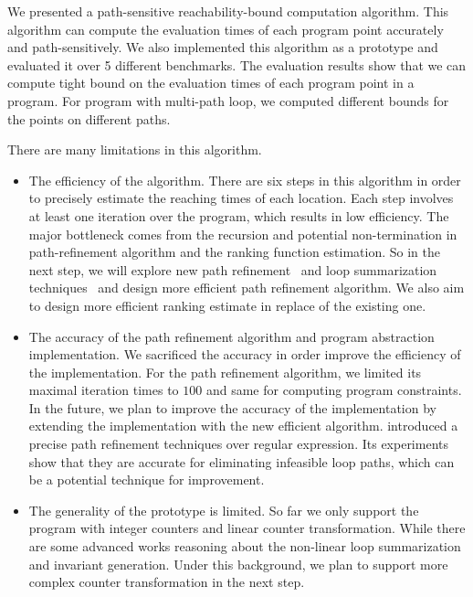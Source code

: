 We presented a path-sensitive reachability-bound computation algorithm.
This algorithm can compute the evaluation times of each program point accurately and path-sensitively.
We also implemented this algorithm as a prototype and evaluated it over 5 different benchmarks.
The evaluation results show that we can compute tight bound on the evaluation times of each program point in a program. For program with multi-path loop, we computed different bounds for the points on different paths.

There are many limitations in this algorithm.
\begin{itemize}
    \item The efficiency of the algorithm.
    There are six steps in this algorithm in order to precisely estimate the reaching times of each location. Each step involves at least one iteration over the program, which results in low efficiency.
    The major bottleneck comes from the recursion and potential non-termination in path-refinement algorithm and the ranking function estimation. So in the next step, we will explore new path refinement~\cite{CyphertBKR19} and loop summarization techniques~\cite{BreckCKR20,KincaidBCR19,KincaidCBR18} and design more efficient path refinement algorithm. We also aim to design more efficient ranking estimate in replace of the existing one.
    \item The accuracy of the path refinement algorithm and program abstraction implementation.
    We sacrificed the accuracy in order improve the efficiency of the implementation. For the path refinement algorithm,
    we limited its maximal iteration times to $100$ and same for computing program constraints. 
    In the future, we plan to improve the accuracy of the implementation by extending the implementation with the new efficient algorithm.
    \cite{CyphertBKR19} introduced a precise path refinement techniques over regular expression. Its experiments show that they are accurate for eliminating infeasible loop paths, which can be a potential technique for improvement.
    \item The generality of the prototype is limited. So far we only support the program with integer counters and linear counter transformation. While there are some advanced works reasoning about the non-linear loop summarization and invariant generation. Under this background, we plan to support more complex counter transformation in the next step.
\end{itemize}
